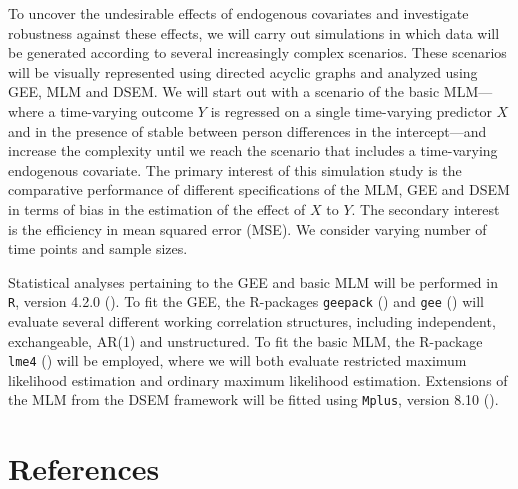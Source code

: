 \documentclass[
  12pt,
  a4paper,
]{article}
\begin{document}
To uncover the undesirable effects of endogenous covariates and
investigate robustness against these effects, we will carry out
simulations in which data will be generated according to several
increasingly complex scenarios. These scenarios will be visually
represented using directed acyclic graphs and analyzed using GEE, MLM
and DSEM. We will start out with a scenario of the basic MLM---where a
time-varying outcome \(Y\) is regressed on a single time-varying
predictor \(X\) and in the presence of stable between person differences
in the intercept---and increase the complexity until we reach the
scenario that includes a time-varying endogenous covariate. The primary
interest of this simulation study is the comparative performance of
different specifications of the MLM, GEE and DSEM in terms of bias in
the estimation of the effect of \(X\) to \(Y\). The secondary interest
is the efficiency in mean squared error (MSE). We consider varying
number of time points and sample sizes.

Statistical analyses pertaining to the GEE and basic MLM will be
performed in \texttt{R}, version 4.2.0 (). To fit the GEE, the R-packages \texttt{geepack}
() and \texttt{gee}
() will evaluate several
different working correlation structures, including independent,
exchangeable, AR(1) and unstructured. To fit the basic MLM, the
R-package \texttt{lme4} ()
will be employed, where we will both evaluate restricted maximum
likelihood estimation and ordinary maximum likelihood estimation.
Extensions of the MLM from the DSEM framework will be fitted using
\texttt{Mplus}, version 8.10 ().

\newpage

\section{References}\label{references}
\end{document}
